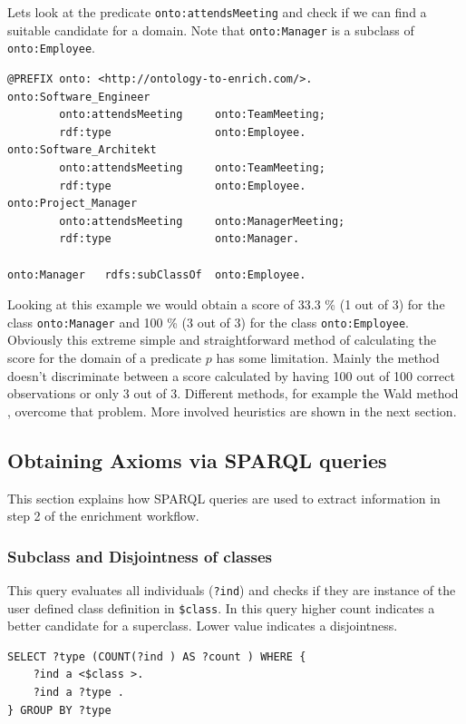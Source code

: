 \begin{example}
Lets look at the predicate \texttt{onto:attendsMeeting} and check if we can find
a suitable candidate for a domain. Note that \texttt{onto:Manager} is a subclass
of \texttt{onto:Employee}.
\end{example}
\begin{lstlisting}[morekeywords={onto, rdf, rdfs}, caption=Triples written in
turtle syntax] @PREFIX onto: <http://ontology-to-enrich.com/>.
onto:Software_Engineer		
		onto:attendsMeeting 	onto:TeamMeeting;
		rdf:type				onto:Employee.
onto:Software_Architekt		
		onto:attendsMeeting 	onto:TeamMeeting;
		rdf:type				onto:Employee.
onto:Project_Manager		
		onto:attendsMeeting 	onto:ManagerMeeting;
		rdf:type				onto:Manager.
		
onto:Manager   rdfs:subClassOf	onto:Employee.
\end{lstlisting}
Looking at this example we would obtain a score of 33.3 \% (1 out of 3) for the
class \texttt{onto:Manager} and 100 \% (3 out of 3) for the class
\texttt{onto:Employee}.\\
Obviously this extreme simple and straightforward method of calculating the score
for the domain of a predicate $p$ has some limitation.
Mainly the method doesn't discriminate between a score calculated by having 100
out of 100 correct observations or only 3 out of 3. Different methods, for
example the Wald method \cite{wald-methods}, overcome that problem. 
More involved heuristics are shown in the next section. 

\subsection{Obtaining Axioms via SPARQL queries}
This section explains how SPARQL queries are used to extract information in step
2 of the enrichment workflow.

\subsubsection*{Subclass and Disjointness of classes}
This query evaluates all individuals (\texttt{?ind}) and checks if they are
instance of the user defined class definition in \texttt{\$class}. In this query
higher count indicates a better candidate for a superclass. 
Lower value indicates a disjointness.
 
\begin{lstlisting} 
SELECT ?type (COUNT(?ind ) AS ?count ) WHERE {
	?ind a <$class >.
	?ind a ?type .
} GROUP BY ?type
\end{lstlisting}

